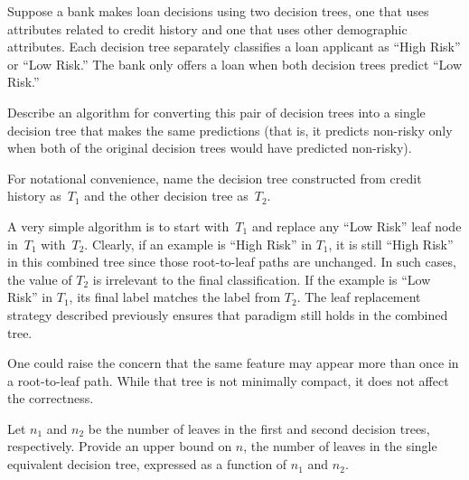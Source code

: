 \begin{problem}
  Suppose a bank makes loan decisions using two decision trees, one that uses attributes related to credit history and one that uses other demographic attributes. Each decision tree separately classifies a loan applicant as “High Risk” or “Low Risk.” The bank only offers a loan when both decision trees predict “Low Risk.”
\end{problem}

\begin{subproblem}
  Describe an algorithm for converting this pair of decision trees into a single decision tree that makes the same predictions (that is, it predicts non-risky only when both of the original decision trees would have predicted non-risky).
\end{subproblem}

For notational convenience, name the decision tree constructed from credit history as~$T_1$ and the other decision tree as~$T_2$.

A very simple algorithm is to start with~$T_1$ and replace any ``Low Risk'' leaf node in~$T_1$ with~$T_2$.  Clearly, if an example is ``High Risk'' in $T_1$, it is still ``High Risk'' in this combined tree since those root-to-leaf paths are unchanged.  In such cases, the value of $T_2$ is irrelevant to the final classification.  If the example is ``Low Risk'' in $T_1$, its final label matches the label from $T_2$.  The leaf replacement strategy described previously ensures that paradigm still holds in the combined tree.

One could raise the concern that the same feature may appear more than once in a root-to-leaf path.  While that tree is not minimally compact, it does not affect the correctness.

\begin{subproblem}
  Let $n_1$ and $n_2$ be the number of leaves in the first and second decision trees, respectively. Provide an upper bound on $n$, the number of leaves in the single equivalent decision tree, expressed as a function of $n_1$ and $n_2$.
\end{subproblem}

